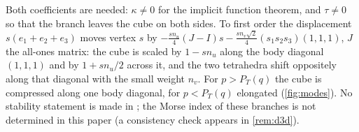 Both coefficients are needed: $\kappa\ne0$ for the implicit function theorem, and $\tau\ne0$ so that the branch leaves
the cube on both sides. To first order the displacement $s(e_1+e_2+e_3)$ moves vertex $s$ by
$-\frac{sn_u}{4}(J-I)s-\frac{sn_v\sqrt2}{4}(s_1s_2s_3)(1,1,1)$, $J$ the all-ones matrix: the cube is scaled by $1-sn_u$
along the body diagonal $(1,1,1)$ and by $1+sn_u/2$ across it, and the two tetrahedra shift oppositely along that
diagonal with the small weight $n_v$. For $p>P_T(q)$ the cube is compressed along one body diagonal, for $p<P_T(q)$
elongated (\cref{fig:modes}). No stability statement is made in \propBone; the Morse index of these branches is not
determined in this paper (a consistency check appears in \cref{rem:d3d}).

